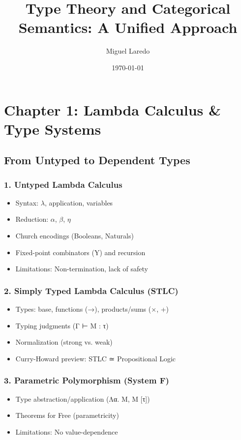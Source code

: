 \documentclass[11pt]{article}
\author{Miguel Laredo}
\date{\today}
\title{Type Theory and Categorical Semantics: A Unified Approach}
\begin{document}
\maketitle
\tableofcontents


\section{Chapter 1: Lambda Calculus \& Type Systems}
\label{sec:org9ae00cd}
\subsection{From Untyped to Dependent Types}
\label{sec:org8857005}
\subsubsection{1. Untyped Lambda Calculus}
\label{sec:org3ae57e4}
\begin{itemize}
\item Syntax: \(\lambda\), application, variables
\item Reduction: \(\alpha\), \(\beta\), \(\eta\)
\item Church encodings (Booleans, Naturals)
\item Fixed-point combinators (Y) and recursion
\item Limitations: Non-termination, lack of safety
\end{itemize}

\subsubsection{2. Simply Typed Lambda Calculus (STLC)}
\label{sec:org4954340}
\begin{itemize}
\item Types: base, functions (→), products/sums (×, +)
\item Typing judgments (Γ ⊢ M : τ)
\item Normalization (strong vs. weak)
\item Curry-Howard preview: STLC ≃ Propositional Logic
\end{itemize}

\subsubsection{3. Parametric Polymorphism (System F)}
\label{sec:org33a71b2}
\begin{itemize}
\item Type abstraction/application (Λα. M, M [τ])
\item Theorems for Free (parametricity)
\item Limitations: No value-dependence
\end{itemize}
\end{document}
